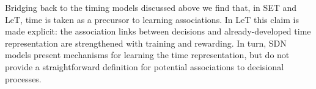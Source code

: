         Bridging back to the timing models discussed above we find that, in SET and LeT, time is taken as a precursor to learning associations. In LeT this claim is made explicit: the association links between decisions and already-developed time representation are strengthened with training and rewarding. In turn, SDN models present mechanisms for learning the time representation, but do not provide a straightforward definition for potential associations to decisional processes. 
        
        
        
        
        
        
        
        
    
        




